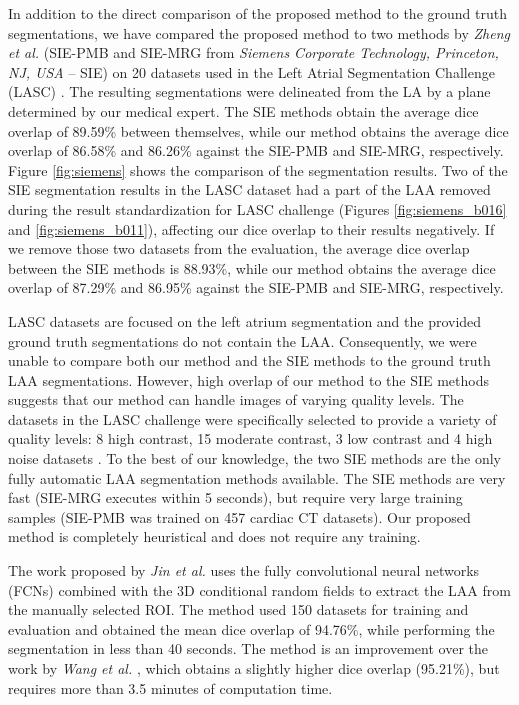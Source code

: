 \documentclass[review]{elsarticle}
\begin{document}
  In addition to the direct comparison of the proposed method to the ground
  truth segmentations, we have compared the proposed method to two methods by
  \emph{Zheng et al.} (SIE-PMB \cite{zheng2008_FourChamberHeartModeling} and
  SIE-MRG \cite{zheng2014_Multipartmodelingsegmentation} from 
  \emph{Siemens Corporate Technology, Princeton, NJ, USA} -- SIE) on 20 datasets used
  in the Left Atrial Segmentation Challenge  (LASC)
  \cite{tobon-gomez2015_BenchmarkAlgorithmsSegmenting}.  The resulting
  segmentations were delineated from the LA by a plane determined by our
  medical expert. 
  The SIE methods  obtain the average dice
  overlap of 89.59\% between themselves, while our method obtains the average dice overlap of
  86.58\% and 86.26\% against the SIE-PMB and SIE-MRG, respectively.  Figure
  \ref{fig:siemens} shows the comparison of the segmentation results. Two of the
  SIE segmentation results in the LASC dataset had a part of the LAA removed during the 
  result standardization for LASC challenge (Figures \ref{fig:siemens_b016} and 
  \ref{fig:siemens_b011}),  affecting our dice overlap to their results negatively.
  If we remove those two datasets from the evaluation, the average dice overlap between the 
  SIE methods is 88.93\%, while our method obtains the average dice overlap of 
  87.29\% and 86.95\% against the SIE-PMB and SIE-MRG, respectively.
  
  LASC datasets are focused on the left atrium segmentation and the provided ground truth
  segmentations do not contain the LAA. Consequently, we were unable to compare 
  both our method and the SIE methods to the ground truth LAA segmentations.
  However, high overlap of our method to the SIE methods suggests that our method 
  can handle images of varying quality levels. The datasets in the LASC challenge were 
  specifically selected to provide a variety of quality levels: 8 high contrast,
  15 moderate contrast, 3 low contrast and 4 high noise datasets \cite{tobon-gomez2015_BenchmarkAlgorithmsSegmenting}.
  To the best of our knowledge, the two SIE methods are the only fully automatic
  LAA segmentation methods available.
  The SIE methods are very fast (SIE-MRG executes within 5 seconds), but
  require very large training samples (SIE-PMB was trained on 457 cardiac CT
  datasets). Our proposed method is completely heuristical and does not require
  any training.  

  The work proposed by \emph{Jin et al.} \cite{jin2018_LeftAtrialAppendage} uses 
  the fully convolutional neural networks (FCNs) combined with the 3D conditional 
  random fields to extract the LAA from the manually selected ROI. The method used 150
  datasets for training and evaluation and
  obtained the mean dice overlap of 94.76\%, while performing the segmentation in
  less than 40 seconds. The method is an improvement over the work by \emph{Wang et al.} 
  \cite{wang2016_LeftAtrialAppendage}, which
  obtains a slightly higher dice overlap (95.21\%), but requires more than 
  3.5 minutes of computation time.
\end{document}
